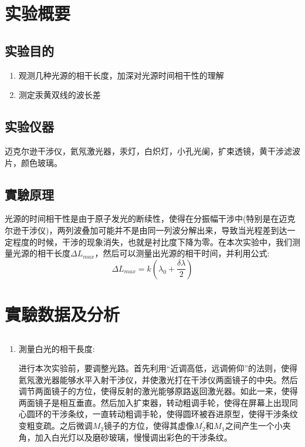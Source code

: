 \documentclass[a4paper]{article}
\begin{document}


\begin{changemargin}{1cm}{1cm}
    \section{实验概要}
    \subsection{实验目的}
    \begin{enumerate}
        \item 观测几种光源的相干长度，加深对光源时间相干性的理解
        \item 测定汞黄双线的波长差
    \end{enumerate}
    \subsection{实验仪器}
    迈克尔逊干涉仪，氦氖激光器，汞灯，白炽灯，小孔光阑，扩束透镜，黄干涉滤波片，颜色玻璃。

    \subsection{實驗原理}
    光源的时间相干性是由于原子发光的断续性，使得在分振幅干涉中(特别是在迈克尔逊干涉仪)，两列波叠加可能并不是由同一列波分解出来，导致当光程差到达一定程度的时候，干涉的现象消失，也就是衬比度下降为零。在本次实验中，我们测量光源的相干长度$\Delta L_{max}$，然后可以测量出光源的相干时间，并利用公式:
    $$\Delta L_{max}=k(\lambda_0+\frac{\delta\lambda}{2})$$
    \section{實驗数据及分析}
    \subsection{}
    \begin{spacing}{1.6}
        \begin{enumerate}
            \item 測量白光的相干長度:

                  进行本次实验前，要调整光路。首先利用“近调高低，远调俯仰”的法则，使得氦氖激光器能够水平入射干涉仪，并使激光打在干涉仪两面镜子的中央。然后调节两面镜子的方位，使得反射的激光能够原路返回激光器。如此一来，使得两面镜子是相互垂直。然后加入扩束器，转动粗调手轮，使得在屏幕上出现同心圆环的干涉条纹，一直转动粗调手轮，使得圆环被吞进原型，使得干涉条纹变粗变疏。之后微调$M_2$镜子的方位，使得其虚像$M_2^\prime$和$M_1$之间产生一个小夹角，加入白光灯以及磨砂玻璃，慢慢调出彩色的干涉条纹。\par


\end{enumerate}
\end{spacing}
\end{changemargin}
\end{document}
